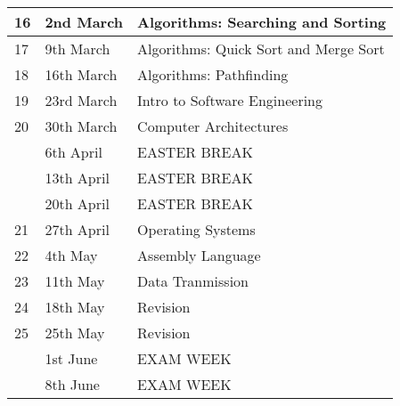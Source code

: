 \documentclass{article}
\begin{document}
\begin{table}[]
\begin{tabular}{| l | l | l |}
16 & 2nd March & Algorithms: Searching and Sorting \\ \hline
17 & 9th March & Algorithms: Quick Sort and Merge Sort \\ \hline
18 & 16th March & Algorithms: Pathfinding  \\ \hline
19 & 23rd March & Intro to Software Engineering \\ \hline
20 & 30th March & Computer Architectures \\ \hline
\rowcolor{green!25}
 & 6th April & EASTER BREAK \\ \hline
\rowcolor{green!25}
 & 13th April & EASTER BREAK \\ \hline
\rowcolor{green!25}
 & 20th April & EASTER BREAK  \\ \hline
21 & 27th April & Operating Systems \\ \hline
22 & 4th May & Assembly Language  \\ \hline
23 & 11th May & Data Tranmission \\ \hline
24 & 18th May & Revision  \\ \hline
25 & 25th May & Revision  \\ \hline
\rowcolor{green!25}
 & 1st June & EXAM WEEK \\ \hline
\rowcolor{green!25}
 & 8th June & EXAM WEEK \\ \hline
\end{tabular}
\end{table}
\end{document}
